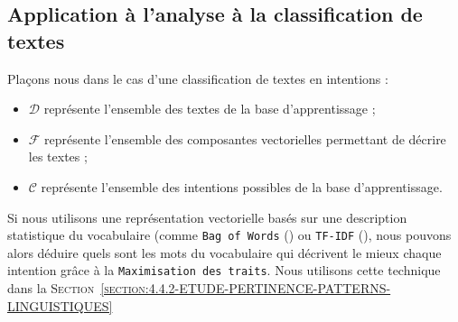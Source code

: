	
	\subsection{Application à l'analyse à la classification de textes}
	\label{annex:C.3.4-DESCRIPTION-IMPLEMENTATION-FEATURES-MAXIMIZATION-METRIC-APPLICATION-TEXTES}
	
		Plaçons nous dans le cas d'une classification de textes en intentions :
		\begin{itemize}
			\item $\mathcal{D}$ représente l'ensemble des textes de la base d'apprentissage ;
			\item $\mathcal{F}$ représente l'ensemble des composantes vectorielles permettant de décrire les textes ;
			\item $\mathcal{C}$ représente l'ensemble des intentions possibles de la base d'apprentissage.
		\end{itemize}
		
		Si nous utilisons une représentation vectorielle basés sur une description statistique du vocabulaire (comme \texttt{Bag of Words} (\cite{harris:1954:distributional-structure}) ou \texttt{TF-IDF} (\cite{ramos:2003:using-tfidf-determine}), nous pouvons alors déduire quels sont les mots du vocabulaire qui décrivent le mieux chaque intention grâce à la \texttt{Maximisation des traits}.
		Nous utilisons cette technique dans la \textsc{Section~\ref{section:4.4.2-ETUDE-PERTINENCE-PATTERNS-LINGUISTIQUES}}